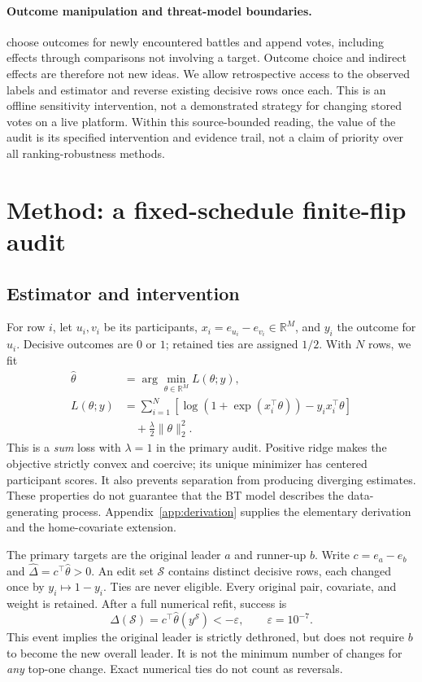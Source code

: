 \documentclass{article}
\newcommand{\R}{\mathbb{R}}
\newcommand{\editset}{\mathcal{S}}
\begin{document}
\paragraph{Outcome manipulation and threat-model boundaries.}
\citet{min2025improving} choose outcomes for newly encountered battles and append votes, including effects through comparisons not involving a target. Outcome choice and indirect effects are therefore not new ideas. We allow retrospective access to the observed labels and estimator and reverse existing decisive rows once each. This is an offline sensitivity intervention, not a demonstrated strategy for changing stored votes on a live platform. Within this source-bounded reading, the value of the audit is its specified intervention and evidence trail, not a claim of priority over all ranking-robustness methods.

\section{Method: a fixed-schedule finite-flip audit}
\label{sec:method}
\subsection{Estimator and intervention}
\label{sec:estimator}
For row $i$, let $u_i,v_i$ be its participants, $x_i=e_{u_i}-e_{v_i}\in\R^M$, and $y_i$ the outcome for $u_i$. Decisive outcomes are $0$ or $1$; retained ties are assigned $1/2$. With $N$ rows, we fit
\begin{equation}
\begin{aligned}
\hat\theta&=\arg\min_{\theta\in\R^M} L(\theta;y),\\
L(\theta;y)&=\sum_{i=1}^{N}\left[\log(1+\exp(x_i^\top\theta))-y_i x_i^\top\theta\right]\\
&\quad+\frac{\lambda}{2}\|\theta\|_2^2.
\end{aligned}
\label{eq:objective}
\end{equation}
This is a \emph{sum} loss with $\lambda=1$ in the primary audit. Positive ridge makes the objective strictly convex and coercive; its unique minimizer has centered participant scores. It also prevents separation from producing diverging estimates. These properties do not guarantee that the BT model describes the data-generating process. Appendix~\ref{app:derivation} supplies the elementary derivation and the home-covariate extension.

The primary targets are the original leader $a$ and runner-up $b$. Write $c=e_a-e_b$ and $\hat\Delta=c^\top\hat\theta>0$. An edit set $\editset$ contains distinct decisive rows, each changed once by $y_i\mapsto1-y_i$. Ties are never eligible. Every original pair, covariate, and weight is retained. After a full numerical refit, success is
\begin{equation}
\Delta(\editset)=c^\top\hat\theta(y^{\editset})<-\varepsilon,\qquad \varepsilon=10^{-7}.
\label{eq:event}
\end{equation}
This event implies the original leader is strictly dethroned, but does not require $b$ to become the new overall leader. It is not the minimum number of changes for \emph{any} top-one change. Exact numerical ties do not count as reversals.
\end{document}
